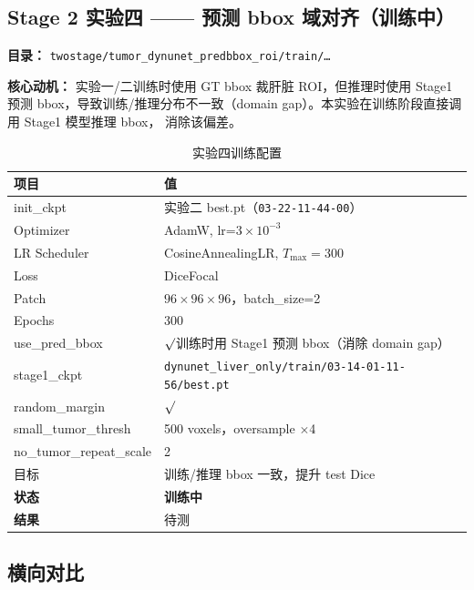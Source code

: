 \documentclass{article}
\begin{document}
	\subsection{Stage 2 实验四 —— 预测 bbox 域对齐（训练中）}

	\noindent\textbf{目录：} \texttt{twostage/tumor\_dynunet\_predbbox\_roi/train/\ldots}

	\noindent\textbf{核心动机：} 实验一/二训练时使用 GT bbox 裁肝脏 ROI，但推理时使用 Stage1 预测
	bbox，导致训练/推理分布不一致（domain gap）。本实验在训练阶段直接调用 Stage1 模型推理 bbox，
	消除该偏差。

	\begin{table}[H]
		\centering
		\caption{实验四训练配置}
		\begin{tabular}{ll}
			\hline
			\textbf{项目} & \textbf{值} \\
			\hline
			init\_ckpt           & 实验二 best.pt（\texttt{03-22-11-44-00}） \\
			Optimizer            & AdamW, lr=$3\times10^{-3}$ \\
			LR Scheduler         & CosineAnnealingLR, $T_{\max}=300$ \\
			Loss                 & DiceFocal \\
			Patch                & $96\times96\times96$，batch\_size=2 \\
			Epochs               & 300 \\
			use\_pred\_bbox      & $\surd$\quad 训练时用 Stage1 预测 bbox（消除 domain gap） \\
			stage1\_ckpt         & \texttt{dynunet\_liver\_only/train/03-14-01-11-56/best.pt} \\
			random\_margin       & $\surd$\quad [8, 24] \\
			small\_tumor\_thresh & 500 voxels，oversample $\times$4 \\
			no\_tumor\_repeat\_scale & 2 \\
			目标                 & 训练/推理 bbox 一致，提升 test Dice \\
			\hline
			\textbf{状态} & \textbf{训练中} \\
			\textbf{结果} & 待测 \\
			\hline
		\end{tabular}
	\end{table}

	\subsection{横向对比}
	
\end{document}
